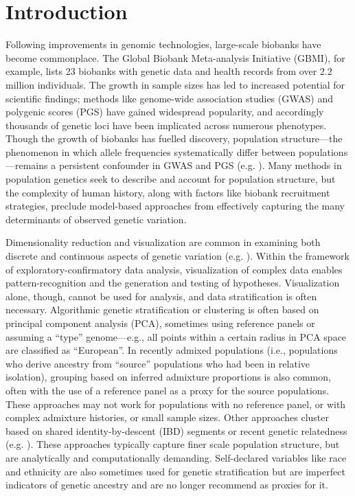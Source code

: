 \section{Introduction}

Following improvements in genomic technologies, large-scale biobanks have become commonplace. The ﻿Global Biobank Meta-analysis Initiative (GBMI), for example, lists 23 biobanks with genetic data and health records from over 2.2 million individuals﻿\cite{zhou_global_2022}. The growth in sample sizes has led to increased potential for scientific findings; methods like genome-wide association studies (GWAS) and polygenic scores (PGS) have gained widespread popularity, and accordingly thousands of genetic loci have been implicated across numerous phenotypes. Though the growth of biobanks has fuelled discovery, population structure---the  phenomenon in which allele frequencies systematically differ between populations---remains a persistent confounder in GWAS and PGS (e.g. \cite{sakaue_dimensionality_2020,zaidi_demographic_2020}). Many methods in population genetics seek to describe and account for population structure, but the complexity of human history, along with factors like biobank recruitment strategies, preclude model-based approaches from effectively capturing the many determinants of observed genetic variation.

Dimensionality reduction and visualization are common in examining both discrete and continuous aspects of genetic variation (e.g. \cite{diaz-papkovich_umap_2019,battey_visualizing_2021}). Within the framework of exploratory-confirmatory data analysis, visualization of complex data enables pattern-recognition and the generation and testing of hypotheses\cite{holmes_modern_2019}. Visualization alone, though, cannot be used for analysis, and data stratification is often necessary. Algorithmic genetic stratification or clustering is often based on principal component analysis (PCA), sometimes using reference panels or assuming a ``type'' genome---e.g., all points within a certain radius in PCA space are classified as ``European''.  In recently admixed populations (i.e., populations who derive ancestry from ``source'' populations who had been in relative isolation), grouping based on inferred admixture proportions is also common, often with the use of a reference panel as a proxy for the source populations. These approaches may not work for populations with no reference panel, or with complex admixture histories, or small sample sizes\citep{ding_polygenic_2023}. Other approaches cluster based on shared identity-by-descent (IBD) segments or recent genetic relatedness (e.g. \citep{freyman_fast_2021,shemirani_rapid_2021}). These approaches typically capture finer scale population structure, but are analytically and computationally demanding. Self-declared variables like race and ethnicity are also sometimes used for genetic stratification but are imperfect indicators of genetic ancestry and are no longer recommend as proxies for it\citep{committee_2023, kaseniit_genetic_2020}.


